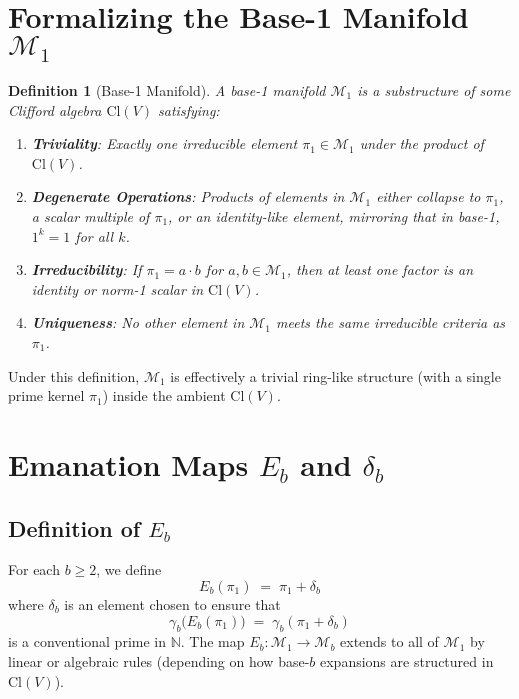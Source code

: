 \documentclass[11pt]{article}
\newtheorem{definition}{Definition}
\begin{document}
\section{Formalizing the Base-1 Manifold \texorpdfstring{$\mathcal{M}_1$}{M1}}

\begin{definition}[Base-1 Manifold]
\label{def:M1}
A \emph{base-1 manifold} $\mathcal{M}_1$ is a substructure of some Clifford algebra 
$\mathrm{Cl}(V)$ satisfying:
\begin{enumerate}
\item \textbf{Triviality}: Exactly one irreducible element $\pi_1 \in \mathcal{M}_1$ 
  under the product of $\mathrm{Cl}(V)$. 
\item \textbf{Degenerate Operations}: Products of elements in $\mathcal{M}_1$ either 
  collapse to $\pi_1$, a scalar multiple of $\pi_1$, or an identity-like element, 
  mirroring that in base-1, $1^k = 1$ for all $k$.
\item \textbf{Irreducibility}: If $\pi_1 = a\cdot b$ for $a,b\in \mathcal{M}_1$, 
  then at least one factor is an identity or norm-1 scalar in $\mathrm{Cl}(V)$.
\item \textbf{Uniqueness}: No other element in $\mathcal{M}_1$ meets the same 
  irreducible criteria as $\pi_1$.
\end{enumerate}
\end{definition}

Under this definition, $\mathcal{M}_1$ is effectively a trivial ring-like structure 
(with a single prime kernel $\pi_1$) inside the ambient $\mathrm{Cl}(V)$.

\section{Emanation Maps \texorpdfstring{$E_b$}{Eb} and \texorpdfstring{$\delta_b$}{db}}

\subsection{Definition of \texorpdfstring{$E_b$}{Eb}}
For each $b\ge2$, we define
\[
  E_b(\pi_1) \;=\; \pi_1 + \delta_b
\]
where $\delta_b$ is an element chosen to ensure that 
\[
  \gamma_b\bigl(E_b(\pi_1)\bigr) \;=\; \gamma_b(\pi_1 + \delta_b)
\]
is a conventional prime in $\mathbb{N}$.  The map 
$E_b:\mathcal{M}_1 \to \mathcal{M}_b$ extends to all of $\mathcal{M}_1$ 
by linear or algebraic rules (depending on how base-$b$ expansions 
are structured in $\mathrm{Cl}(V)$).
\end{document}
